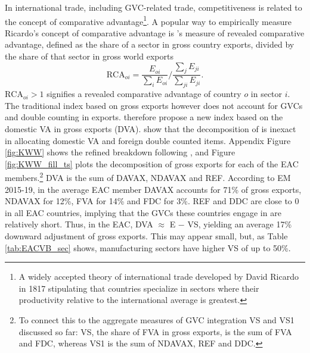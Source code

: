 \documentclass[a4paper]{article}
\begin{document}
In international trade, including GVC-related trade, competitiveness is related to the concept of comparative advantage\footnote{A widely accepted theory of international trade developed by David Ricardo in 1817 stipulating that countries specialize in sectors where their productivity relative to the international average is greatest.}. 
A popular way to empirically measure Ricardo's concept of comparative advantage is \citet{balassa1965trade}'s measure of revealed comparative advantage, defined as the share of a sector in gross country exports, divided by the share of that sector in gross world exports
%
\begin{equation}
\text{RCA}_{oi} = \frac{E_{oi}}{\sum_i E_{oi}} \Bigg/ \frac{\sum_j E_{ji}}{\sum_{ji} E_{ji}}.
\end{equation}
%
$\text{RCA}_{oi}>1$ signifies a revealed comparative advantage of country $o$ in sector $i$. The traditional index based on gross exports however does not account for GVCs and double counting in exports. \citet{koopman2014tracing} therefore propose a new index based on the domestic VA in gross exports (DVA). \citet{borin2019measuring} show that the decomposition of \citet{koopman2014tracing} is inexact in allocating domestic VA and foreign double counted items.%
Appendix Figure \ref{fig:KWW} shows the refined breakdown following \citet{borin2019measuring}, and Figure \ref{fig:KWW_fill_ts} plots the decomposition of gross exports for each of the EAC members.\footnote{To connect this to the aggregate measures of GVC integration VS and VS1 discussed so far: VS, the share of FVA in gross exports, is the sum of FVA and FDC, whereas VS1 is the sum of NDAVAX, REF and DDC.} DVA is the sum of DAVAX, NDAVAX and REF. According to EM 2015-19, in the average EAC member DAVAX accounts for 71\% of gross exports, NDAVAX for 12\%, FVA for 14\% and FDC for 3\%. REF and DDC are close to 0 in all EAC countries, implying that the GVCs these countries engage in are relatively short. Thus, in the EAC, DVA $\approx$ E $-$ VS, yielding an average 17\% downward adjustment of gross exports. This may appear small, but, as Table \ref{tab:EACVB_sec} shows, manufacturing sectors have higher VS of up to 50\%. \newline
 
\end{document}
